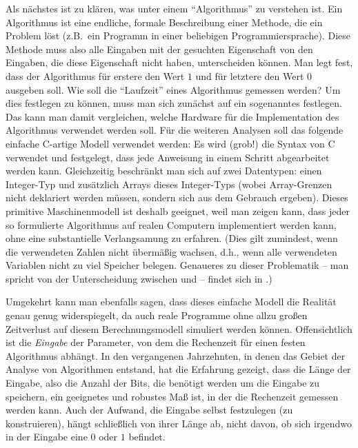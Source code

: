 Als nächstes ist zu klären, was unter einem "`Algorithmus"' zu
verstehen ist. Ein Algorithmus ist eine endliche, formale Beschreibung
einer Methode, die ein Problem löst (z.B.~ein Programm in einer
beliebigen Programmiersprache). Diese Methode muss also alle Eingaben
mit der gesuchten Eigenschaft von den Eingaben, die diese Eigenschaft
nicht haben, unterscheiden können. Man legt fest, dass der Algorithmus
für erstere den Wert $1$ und für letztere den Wert $0$ ausgeben
soll. Wie soll die "`Laufzeit"' eines Algorithmus gemessen werden? Um
dies festlegen zu können, muss man sich zunächst auf ein sogenanntes
 festlegen. Das kann man damit vergleichen,
welche Hardware für die Implementation des Algorithmus verwendet
werden soll. Für die weiteren Analysen soll das folgende einfache
C-artige Modell verwendet werden: Es wird (grob!) die Syntax von C
verwendet und festgelegt, dass jede Anweisung in einem Schritt
abgearbeitet werden kann. Gleichzeitig beschränkt man sich auf zwei
Datentypen: einen Integer-Typ und zusätzlich Arrays dieses
Integer-Typs (wobei Array-Grenzen nicht deklariert werden müssen,
sondern sich aus dem Gebrauch ergeben). Dieses primitive
Maschinenmodell ist deshalb geeignet, weil man zeigen kann, dass jeder
so formulierte Algorithmus auf realen Computern implementiert werden
kann, ohne eine substantielle Verlangsamung zu erfahren.  
%
(Dies gilt zumindest, wenn die verwendeten Zahlen nicht
übermäßig wachsen, d.h., wenn alle verwendeten Variablen nicht zu viel
Speicher belegen. Genaueres zu dieser Problematik -- man spricht von
der Unterscheidung zwischen  und
 -- findet sich in \cite[S.~62f]{Sch01}.)

Umgekehrt kann man ebenfalls sagen, dass dieses einfache Modell die
Realität genau genug widerspiegelt, da auch reale Programme ohne allzu
großen Zeitverlust auf diesem Berechnungsmodell simuliert werden
können. Offensichtlich ist die \emph{Eingabe} der Parameter, von dem
die Rechenzeit für einen festen Algorithmus abhängt. In den
vergangenen Jahrzehnten, in denen das Gebiet der Analyse von
Algorithmen entstand, hat die Erfahrung gezeigt, dass die Länge der
Eingabe, also die Anzahl der Bits, die benötigt werden um die Eingabe
zu speichern, ein geeignetes und robustes Maß ist, in der die
Rechenzeit gemessen werden kann. Auch der Aufwand, die Eingabe selbst
festzulegen (zu konstruieren), hängt schließlich von ihrer Länge ab,
nicht davon, ob sich irgendwo in der Eingabe eine $0$ oder $1$
befindet.

